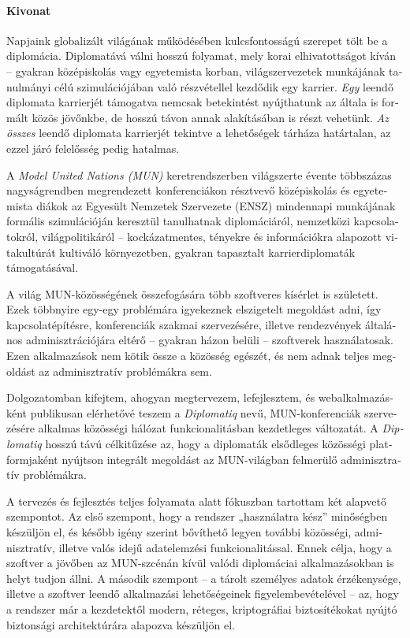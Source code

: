 \begin{otherlanguage}{magyar}

\paragraph*{Kivonat}
{}
\thispagestyle{plain}

Napjaink globalizált világának működésében kulcsfontosságú szerepet tölt be a diplomácia. Diplomatává válni hosszú folyamat, mely korai elhivatottságot kíván – gyakran középiskolás vagy egyetemista korban, világszervezetek munkájának tanulmányi célú szimulációjában való részvétellel kezdődik egy karrier. \emph{Egy} leendő diplomata karrierjét támogatva nemcsak betekintést nyújthatunk az általa is formált közös jövőnkbe, de hosszú távon annak alakításában is részt vehetünk. \emph{Az összes} leendő diplomata karrierjét tekintve a lehetőségek tárháza határtalan, az ezzel járó felelősség pedig hatalmas.

A \emph{Model United Nations (MUN)} keretrendszerben világszerte évente többszázas nagyságrendben megrendezett konferenciákon résztvevő középiskolás és egyetemista diákok az Egyesült Nemzetek Szervezete (ENSZ) mindennapi munkájának formális szimulációján keresztül tanulhatnak diplomáciáról, nemzetközi kapcsolatokról, világpolitikáról – kockázatmentes, tényekre és információkra alapozott vitakultúrát kultiváló környezetben, gyakran tapasztalt karrierdiplomaták támogatásával.

A világ MUN-közösségének összefogására több szoftveres kísérlet is született. Ezek többnyire egy-egy problémára igyekeznek elszigetelt megoldást adni, így kapcsolatépítésre, konferenciák szakmai szervezésére, illetve rendezvények általános adminisztrációjára eltérő – gyakran házon belüli – szoftverek használatosak. Ezen alkalmazások nem kötik össze a közösség egészét, és nem adnak teljes megoldást az adminisztratív problémákra sem.

Dolgozatomban kifejtem, ahogyan megtervezem, lefejlesztem, és webalkalmazásként publikusan elérhetővé teszem a \emph{Diplomatiq} nevű, MUN-konferenciák szervezésére alkalmas közösségi hálózat funkcionalitásban kezdetleges változatát. A \emph{Diplomatiq} hosszú távú célkitűzése az, hogy a diplomaták elsődleges közösségi platformjaként nyújtson integrált megoldást az MUN-világban felmerülő adminisztratív problémákra.

A tervezés és fejlesztés teljes folyamata alatt fókuszban tartottam két alapvető szempontot. Az első szempont, hogy a rendszer „használatra kész” minőségben készüljön el, és később igény szerint bővíthető legyen további közösségi, adminisztratív, illetve valós idejű adatelemzési funkcionalitással. Ennek célja, hogy a szoftver a jövőben az MUN-szcénán kívül valódi diplomáciai alkalmazásokban is helyt tudjon állni. A második szempont – a tárolt személyes adatok érzékenysége, illetve a szoftver leendő alkalmazási lehetőségeinek figyelembevételével – az, hogy a rendszer már a kezdetektől modern, réteges, kriptográfiai biztosítékokat nyújtó biztonsági architektúrára alapozva készüljön el.


\end{otherlanguage}
